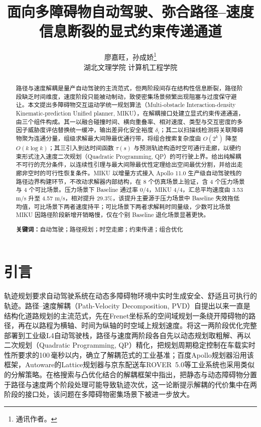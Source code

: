 \documentclass[a4paper,zihao=5]{ctexart}
\title{面向多障碍物自动驾驶、弥合路径--速度信息断裂的显式约束传递通道}
\author{廖嘉旺，孙成娇\thanks{通讯作者。}\\[2pt]\normalsize 湖北文理学院 计算机工程学院}
\date{}
\theoremstyle{definition}
\begin{document}
\maketitle

\begin{abstract}
\small
\noindent
路径与速度解耦是量产自动驾驶的主流范式，但两阶段间存在结构性信息断裂，路径阶段缺乏时间维度，速度阶段只能被动制动，致使密集场景频繁出现阻塞与过度保守避让。本文提出多障碍物交互运动学统一规划算法（Multi-obstacle Interaction-density Kinematic-prediction Unified planner, MIKU），在解耦接口处建立显式约束传递通道，由三个组件构成。其一以融合碰撞时间、横向重叠率、相对速度、类型与交互密度的多因子威胁度评估替换统一缓冲，输出差异化安全裕度 $\delta_i$；其二以扫描线检测将关联障碍物聚为连通分量，组级求解最大间隙最优通行带，将组合搜索复杂度由 $O(2^k)$ 降至 $O(k\log k)$；其三引入到达时间函数 $\tau(s)$ 与预测轨迹构造时空可通行走廊，以硬约束形式注入速度二次规划（Quadratic Programming, QP）的可行驶上界。给出纯解耦不可行的充分条件，以连续性引理与最大间隙最优性定理给出空间最优分割，并给出走廊非空时的可行性恢复条件。MIKU 以增量方式接入 Apollo 11.0 生产级自动驾驶栈的路径边界构建环节，不改动求解器内部结构，在 8 个仿真场景上验证，含 4 个压力场景与 4 个可比场景。压力场景下 Baseline 通过率 0/4，MIKU 4/4，汇总平均速度由 3.53 m/s 升至 4.57 m/s，相对提升 29.3\%，该提升主要源于压力场景中 Baseline 失效拖低均值，可比场景下两者速度持平；可比场景下两者求解耗时同量级，少数可比场景 MIKU 因路径阶段新增开销略慢，仅在个别 Baseline 退化场景显著更快。

\vspace{0.5em}
\noindent\textbf{关键词：}自动驾驶；路径规划；时空走廊；约束传递；组合优化
\end{abstract}
\section{引言}
\label{sec:intro}

轨迹规划要求自动驾驶系统在动态多障碍物环境中实时生成安全、舒适且可执行的轨迹。路径--速度解耦（Path-Velocity Decomposition, PVD）自\citet{kant1986pvd}提出以来一直是结构化道路规划的主流范式，先在Frenet坐标系的空间域规划一条绕开障碍物的路径，再在以路程为横轴、时间为纵轴的时空域上规划速度。\citet{fan2018baidu}将这一两阶段优化完整部署到工业级L4自动驾驶栈，路径与速度两阶段各自先以动态规划取粗解、再以二次规划（Quadratic Programming, QP）精化，把规划周期稳定控制在车载实时性所要求的100\,毫秒以内，确立了解耦范式的工业基准；百度Apollo规划器\citep{apollo2024}沿用该框架，Autoware的Lattice规划器与京东配送车ROVER~5.0\citep{wang2022_jfr}等工业系统也采用类似的分解策略。\citet{meng2019_access}在格搜索与凸优化结合的解耦框架中指出，把静态与动态障碍物分置于路径与速度两个阶段处理可能导致轨迹次优，这一论断提示解耦的代价集中在两阶段的接口处，该问题在多障碍物密集场景下被进一步放大\citep{gonzalez2016}。
\end{document}
